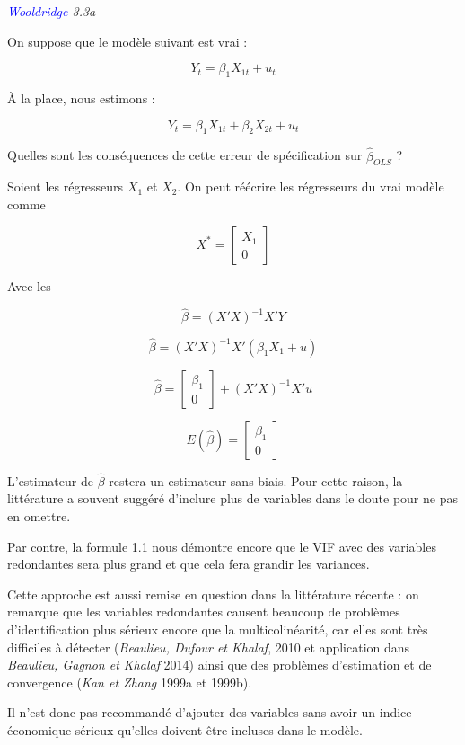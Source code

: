 \documentclass[14pt]{extarticle} %
\theoremstyle{definition}
\theoremstyle{plain}
\newcommand{\livre}[1]{\textcolor{blue}{#1}}
\begin{document}
\textit{\livre{Wooldridge} 3.3a}

On suppose que le modèle suivant est vrai :

\[
Y_t = \beta_1 X_{1t} + u_t
\]

À la place, nous estimons :

\[
Y_t = \beta_1 X_{1t} + \beta_2 X_{2t} + u_t
\]

Quelles sont les conséquences de cette erreur de spécification sur $\hat{\beta}_{OLS}$ ?

Soient les régresseurs $X_1$ et $X_2$. On peut réécrire les régresseurs du vrai modèle comme

\[
X^* = \begin{bmatrix} X_1 \\ 0 \end{bmatrix}
\]

Avec les

\[
\hat{\beta} = (X'X)^{-1}X'Y
\]

\[
\hat{\beta} = (X'X)^{-1}X'(\beta_1 X_1 + u)
\]

\[
\hat{\beta} = \begin{bmatrix} \beta_1 \\ 0 \end{bmatrix} + (X'X)^{-1}X'u
\]

\[
E(\hat{\beta}) = \begin{bmatrix} \beta_1 \\ 0 \end{bmatrix}
\]

L’estimateur de $\hat{\beta}$ restera un estimateur sans biais. Pour cette raison, la littérature a souvent suggéré d’inclure plus de variables dans le doute pour ne pas en omettre.

Par contre, la formule 1.1 nous démontre encore que le VIF avec des variables redondantes sera plus grand et que cela fera grandir les variances.

Cette approche est aussi remise en question dans la littérature récente : on remarque que les variables redondantes causent beaucoup de problèmes d’identification plus sérieux encore que la multicolinéarité, car elles sont très difficiles à détecter (\textit{Beaulieu, Dufour et Khalaf}, 2010 et application dans \textit{Beaulieu, Gagnon et Khalaf} 2014) ainsi que des problèmes d’estimation et de convergence (\textit{Kan et Zhang} 1999a et 1999b).

Il n’est donc pas recommandé d’ajouter des variables sans avoir un indice économique sérieux qu’elles doivent être incluses dans le modèle.
\end{document}
